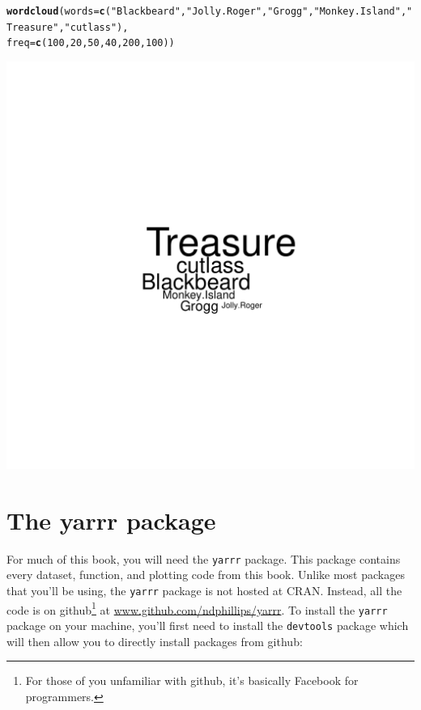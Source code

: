 \documentclass{tufte-book}\usepackage[]{graphicx}\usepackage[]{color}
\makeatletter
\def\maxwidth{ %
  \ifdim\Gin@nat@width>\linewidth
    \linewidth
  \else
    \Gin@nat@width
  \fi
}
\newcommand{\hlnum}[1]{\textcolor[rgb]{0.686,0.059,0.569}{#1}}%
\newcommand{\hlstr}[1]{\textcolor[rgb]{0.192,0.494,0.8}{#1}}%
\newcommand{\hlstd}[1]{\textcolor[rgb]{0.345,0.345,0.345}{#1}}%
\newcommand{\hlkwc}[1]{\textcolor[rgb]{0.333,0.667,0.333}{#1}}%
\newcommand{\hlkwd}[1]{\textcolor[rgb]{0.737,0.353,0.396}{\textbf{#1}}}%
\newenvironment{kframe}{%
 \def\at@end@of@kframe{}%
 \ifinner\ifhmode%
  \def\at@end@of@kframe{\end{minipage}}%
  \begin{minipage}{\columnwidth}%
 \fi\fi%
 \def\FrameCommand##1{\hskip\@totalleftmargin \hskip-\fboxsep
 \colorbox{shadecolor}{##1}\hskip-\fboxsep
     \hskip-\linewidth \hskip-\@totalleftmargin \hskip\columnwidth}%
 \MakeFramed {\advance\hsize-\width
   \@totalleftmargin\z@ \linewidth\hsize
   \@setminipage}}%
 {\par\unskip\endMakeFramed%
 \at@end@of@kframe}
\newenvironment{knitrout}{}{} %
\makeatother
\begin{document}
\begin{knitrout}
\color{fgcolor}\begin{kframe}
\begin{alltt}
\hlkwd{wordcloud}\hlstd{(}\hlkwc{words} \hlstd{=} \hlkwd{c}\hlstd{(}\hlstr{"Blackbeard"}\hlstd{,} \hlstr{"Jolly.Roger"}\hlstd{,} \hlstr{"Grogg"}\hlstd{,} \hlstr{"Monkey.Island"}\hlstd{,} \hlstr{"Treasure"}\hlstd{,} \hlstr{"cutlass"}\hlstd{),}
              \hlkwc{freq} \hlstd{=} \hlkwd{c}\hlstd{(}\hlnum{100}\hlstd{,} \hlnum{20}\hlstd{,} \hlnum{50}\hlstd{,} \hlnum{40}\hlstd{,} \hlnum{200}\hlstd{,} \hlnum{100}\hlstd{))}
\end{alltt}
\end{kframe}
\includegraphics[width=\maxwidth]{figure/unnamed-chunk-8-1} 

\end{knitrout}


\section{The yarrr package}

For much of this book, you will need the \texttt{yarrr} package. This package contains every dataset, function, and plotting code from this book. Unlike most packages that you'll be using, the \texttt{yarrr} package is not hosted at CRAN. Instead, all the code is on github\footnote{For those of you unfamiliar with github, it's basically Facebook for programmers.} at \textcolor{blue}{\href{<www.github.com/ndphillips/yarrr>}{www.github.com/ndphillips/yarrr}}. To install the \texttt{yarrr} package on your machine, you'll first need to install the \texttt{devtools} package which will then allow you to directly install packages from github:
\end{document}
